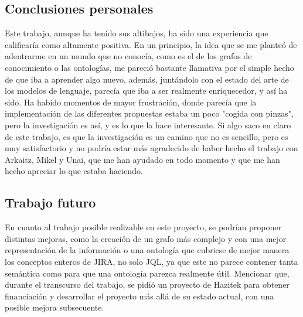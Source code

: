 \subsection{Conclusiones personales}
Este trabajo, aunque ha tenido sus altibajos, ha sido una experiencia que calificaría como altamente positiva. En un principio, la idea que se me planteó de adentrarme en un mundo que no conocía, como es el de los grafos de conocimiento o las ontologías, me pareció bastante llamativa por el simple hecho de que iba a aprender algo nuevo, además, juntándolo con el estado del arte de los modelos de lenguaje, parecía que iba a ser realmente enriquecedor, y así ha sido. Ha habido momentos de mayor frustración, donde parecía que la implementación de las diferentes propuestas estaba un poco "cogida con pinzas", pero la investigación es así, y es lo que la hace interesante. Si algo saco en claro de este trabajo, es que la investigación es un camino que no es sencillo, pero es muy satisfactorio y no podría estar más agradecido de haber hecho el trabajo con Arkaitz, Mikel y Unai, que me han ayudado en todo momento y que me han hecho apreciar lo que estaba haciendo.

\subsection{Trabajo futuro}
En cuanto al trabajo posible realizable en este proyecto, se podrían proponer distintas mejoras, como la creación de un grafo más complejo y con una mejor representación de la información o una ontología que cubriese de mejor manera los conceptos enteros de JIRA, no solo JQL, ya que este no parece contener tanta semántica como para que una ontología parezca realmente útil. Mencionar que, durante el transcurso del trabajo, se pidió un proyecto de Hazitek para obtener financiación y desarrollar el proyecto más allá de su estado actual, con una posible mejora subsecuente.